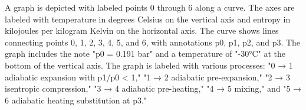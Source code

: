 A graph is depicted with labeled points 0 through 6 along a curve. The axes are labeled with temperature in degrees Celsius on the vertical axis and entropy in kilojoules per kilogram Kelvin on the horizontal axis. The curve shows lines connecting points 0, 1, 2, 3, 4, 5, and 6, with annotations p0, p1, p2, and p3. The graph includes the note "p0 = 0.191 bar" and a temperature of "-30°C" at the bottom of the vertical axis. The graph is labeled with various processes: "0 → 1 adiabatic expansion with p1/p0 < 1," "1 → 2 adiabatic pre-expansion," "2 → 3 isentropic compression," "3 → 4 adiabatic pre-heating," "4 → 5 mixing," and "5 → 6 adiabatic heating substitution at p3."